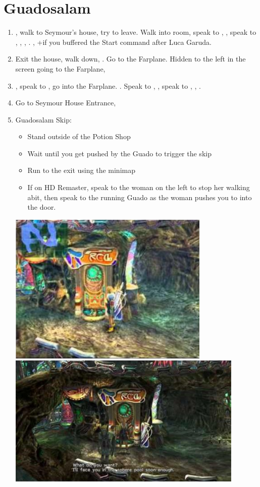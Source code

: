\chapter{Guadosalam}

\begin{enumerate}
    \item \sd, walk to Seymour's house, try to leave. Walk into room, speak to \auron, \sd, speak to \wakka, \lulu, \rikku, \yuna. \sd, \skippablefmv+\cs[5:50] if you buffered the Start command after Luca Garuda.
    \item Exit the house, walk down, \sd. Go to the Farplane. Hidden to the left in the screen going to the Farplane, 
    \item \sd, speak to \auron, go into the Farplane. \cs[1:20]. Speak to \wakka, \sd, speak to \yuna, \cs[2:10], \sd.
    \item Go to Seymour House Entrance, \sd
    \bothcb \wincb \losscb
    \item Guadosalam Skip:
    \begin{itemize}
        \item Stand outside of the Potion Shop
        \item Wait until you get pushed by the Guado to trigger the skip
        \item Run to the exit using the minimap
        \item If on HD Remaster, speak to the woman on the left to stop her walking abit, then speak to the running Guado as the woman pushes you to into the door.
    \end{itemize}
    \includegraphics{graphics/guadoskipstandard}
    \includegraphics{graphics/guadoskipremaster}
\end{enumerate}
